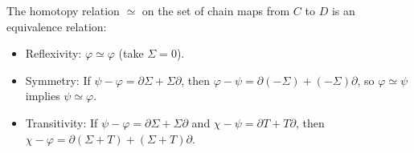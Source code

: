 The homotopy relation $\simeq$ on the set of chain maps from $C$ to $D$ is an equivalence relation:
\begin{itemize}
\item Reflexivity: $\varphi \simeq \varphi$ (take $\Sigma = 0$).
\item Symmetry: If $\psi - \varphi = \partial \Sigma + \Sigma \partial$, then $\varphi - \psi = \partial(-\Sigma) + (-\Sigma)\partial$, so $\varphi \simeq \psi$ implies $\psi \simeq \varphi$.
\item Transitivity: If $\psi - \varphi = \partial \Sigma + \Sigma \partial$ and $\chi - \psi = \partial T + T \partial$, then $\chi - \varphi = \partial(\Sigma + T) + (\Sigma + T)\partial$.
\end{itemize}
